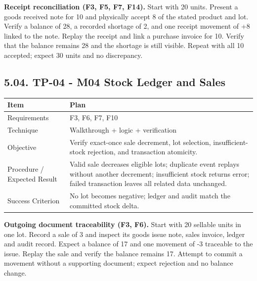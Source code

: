 \textbf{Receipt reconciliation (F3, F5, F7, F14).}
Start with 20 units. Present a goods received note for 10 and physically accept 8 of the stated product and lot. Verify a balance of 28, a recorded shortage of 2, and one receipt movement of +8 linked to the note. Replay the receipt and link a purchase invoice for 10. Verify that the balance remains 28 and the shortage is still visible. Repeat with all 10 accepted; expect 30 units and no discrepancy.

\subsection{5.04. TP-04 - M04 Stock Ledger and Sales}\label{tp-04---m04-stock-ledger-and-sales}

{\def\LTcaptype{none} %
\begin{longtable}[]{|
  >{\raggedright\arraybackslash}m{}|
  >{\raggedright\arraybackslash}m{}|}
\hline
\begin{minipage}[c]{\linewidth}\raggedright
\textbf{Item}
\end{minipage} & \begin{minipage}[c]{\linewidth}\raggedright
\textbf{Plan}
\end{minipage} \\
\hline
\endhead

\endlastfoot
Requirements & F3, F6, F7, F10 \\ \hline
Technique & Walkthrough + logic + verification \\ \hline
Objective & Verify exact-once sale decrement, lot selection, insufficient-stock rejection, and transaction atomicity. \\ \hline
Procedure / Expected Result & Valid sale decreases eligible lots; duplicate event replays without another decrement; insufficient stock returns error; failed transaction leaves all related data unchanged. \\ \hline
Success Criterion & No lot becomes negative; ledger and audit match the committed stock delta. \\ \hline
\end{longtable}
}

\textbf{Outgoing document traceability (F3, F6).}
Start with 20 sellable units in one lot. Record a sale of 3 and inspect its goods issue note, sales invoice, ledger and audit record. Expect a balance of 17 and one movement of -3 traceable to the issue. Replay the sale and verify the balance remains 17. Attempt to commit a movement without a supporting document; expect rejection and no balance change.


